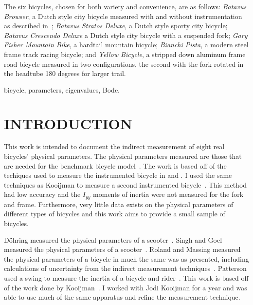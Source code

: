 \documentclass{bmd2010p}
\begin{document}
The six bicycles, chosen for both variety and convenience, are as follows:
\emph{Batavus Browser}, a Dutch style city bicycle measured with and without
instrumentation as described in~\cite{Kooijman2009a}; \emph{Batavus Stratos
Deluxe}, a Dutch style sporty city bicycle; \emph{Batavus Crescendo Deluxe} a
Dutch style city bicycle with a suspended fork; \emph{Gary Fisher Mountain
Bike}, a hardtail mountain bicycle; \emph{Bianchi Pista}, a modern steel frame
track racing bicycle; and \emph{Yellow Bicycle}, a stripped down aluminum frame
road bicycle measured in two configurations, the second with the fork rotated
in the headtube 180 degrees for larger trail.
\begin{keywords}
bicycle,
parameters,
eigenvalues,
Bode.
\end{keywords}

\section{INTRODUCTION}

This work is intended to document the indirect measurement of eight real
bicycles' physical parameters. The physical parameters measured are those that
are needed for the benchmark bicycle model~\cite{Meijaard2007}. The work is
based off of the techiques used to measure the instrumented bicycle in
\cite{Kooijman2006} and \cite{Kooijman2008}. I used the same techniques as
Kooijman to measure a second instrumented bicycle~\cite{Moore2009a}. This
method had low accuracy and the $I_{yy}$ moments of inertia were
not measured for the fork and frame. Furthermore, very little data exists on
the physical parameters of different types of bicycles and this work aims to
provide a small sample of bicycles.

D\"{o}hring measured the physical parameters of a scooter~\cite{Dohring1953}.
Singh and Goel measured the physical parameters of a scooter~\cite{Singh1971}.
Roland and Massing measured the physical parameters of a bicycle in much the
same was as presented, including calculations of uncertainty from the indirect
measurement techniques~\cite{Roland1971}. Patterson used a swing to measure the
inertia of a bicycle and rider~\cite{Patterson2004}. This work is based off of the work
done by Kooijman~\cite{Kooijman2006}. I worked with Jodi Kooijman for a year and
was able to use much of the same apparatus and refine the measurement
technique.
\end{document}
